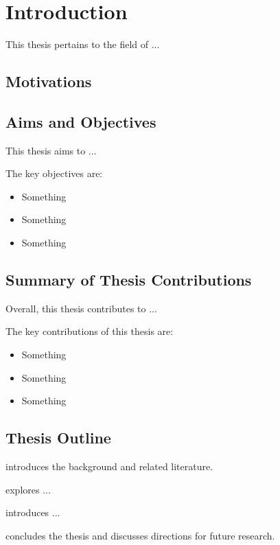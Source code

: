 \chapter{Introduction}
This thesis pertains to the field of ...


\section{Motivations}


\section{Aims and Objectives}
This thesis aims to ...

The key objectives are:
\begin{itemize}[topsep=0pt,beginpenalty=10000,first=]
	\item Something
	\item Something
	\item Something
\end{itemize}


\section{Summary of Thesis Contributions}
Overall, this thesis contributes to ...

The key contributions of this thesis are:
\begin{itemize}[topsep=0pt,beginpenalty=10000,first=]
	\item Something
	\item Something
	\item Something
\end{itemize}


\section{Thesis Outline}
 introduces the background and related literature.

 explores ...

 introduces ...

 concludes the thesis and discusses directions for future research.

